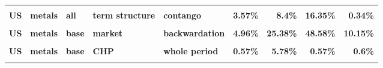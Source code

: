 \documentclass[
  authoryear,
  preprint,
  3p]{elsarticle}
\begin{document}
\begin{landscape}
\begin{longtable}[t]{>{}l>{}l>{}l>{}l>{}l>{}r>{}r>{}r>{}r}
\textbf{\cellcolor{gray!10}{US}} & \textbf{\cellcolor{gray!10}{metals}} & \textbf{\cellcolor{gray!10}{all}} & \textbf{\cellcolor{gray!10}{term structure}} & \textbf{\cellcolor{gray!10}{backwardation}} & \textcolor[HTML]{4285f4}{\textbf{\cellcolor{gray!10}{1.5\%}}} & \textcolor[HTML]{4285f4}{\textbf{\cellcolor{gray!10}{6.51\%}}} & \textcolor[HTML]{4285f4}{\textbf{\cellcolor{gray!10}{13.24\%}}} & \textcolor[HTML]{4285f4}{\textbf{\cellcolor{gray!10}{0.33\%}}}\\
\textbf{US} & \textbf{metals} & \textbf{all} & \textbf{term structure} & \textbf{contango} & \textcolor[HTML]{4285f4}{\textbf{3.57\%}} & \textcolor[HTML]{4285f4}{\textbf{8.4\%}} & \textcolor[HTML]{4285f4}{\textbf{16.35\%}} & \textcolor[HTML]{4285f4}{\textbf{0.34\%}}\\
\addlinespace
\textbf{\cellcolor{gray!10}{US}} & \textbf{\cellcolor{gray!10}{metals}} & \textbf{\cellcolor{gray!10}{base}} & \textbf{\cellcolor{gray!10}{market}} & \textbf{\cellcolor{gray!10}{whole period}} & \textcolor[HTML]{4285f4}{\textbf{\cellcolor{gray!10}{5.39\%}}} & \textcolor[HTML]{4285f4}{\textbf{\cellcolor{gray!10}{23.13\%}}} & \textcolor[HTML]{4285f4}{\textbf{\cellcolor{gray!10}{50.77\%}}} & \textcolor[HTML]{4285f4}{\textbf{\cellcolor{gray!10}{19.74\%}}}\\
\textbf{US} & \textbf{metals} & \textbf{base} & \textbf{market} & \textbf{backwardation} & \textcolor[HTML]{4285f4}{\textbf{4.96\%}} & \textcolor[HTML]{4285f4}{\textbf{25.38\%}} & \textcolor[HTML]{4285f4}{\textbf{48.58\%}} & \textcolor[HTML]{4285f4}{\textbf{10.15\%}}\\
\textbf{\cellcolor{gray!10}{US}} & \textbf{\cellcolor{gray!10}{metals}} & \textbf{\cellcolor{gray!10}{base}} & \textbf{\cellcolor{gray!10}{market}} & \textbf{\cellcolor{gray!10}{contango}} & \textcolor[HTML]{4285f4}{\textbf{\cellcolor{gray!10}{5.66\%}}} & \textcolor[HTML]{4285f4}{\textbf{\cellcolor{gray!10}{21.55\%}}} & \textcolor[HTML]{4285f4}{\textbf{\cellcolor{gray!10}{52.45\%}}} & \textcolor[HTML]{4285f4}{\textbf{\cellcolor{gray!10}{27.5\%}}}\\
\textbf{US} & \textbf{metals} & \textbf{base} & \textbf{CHP} & \textbf{whole period} & \textcolor[HTML]{4285f4}{\textbf{0.57\%}} & \textcolor[HTML]{4285f4}{\textbf{5.78\%}} & \textcolor[HTML]{4285f4}{\textbf{0.57\%}} & \textcolor[HTML]{4285f4}{\textbf{0.6\%}}\\
\textbf{\cellcolor{gray!10}{US}} & \textbf{\cellcolor{gray!10}{metals}} & \textbf{\cellcolor{gray!10}{base}} & \textbf{\cellcolor{gray!10}{CHP}} & \textbf{\cellcolor{gray!10}{backwardation}} & \textcolor[HTML]{4285f4}{\textbf{\cellcolor{gray!10}{1.4\%}}} & \textcolor[HTML]{4285f4}{\textbf{\cellcolor{gray!10}{5.18\%}}} & \textcolor[HTML]{4285f4}{\textbf{\cellcolor{gray!10}{1.91\%}}} & \textcolor[HTML]{4285f4}{\textbf{\cellcolor{gray!10}{0.29\%}}}\\

\end{longtable}
\end{landscape}
\end{document}

